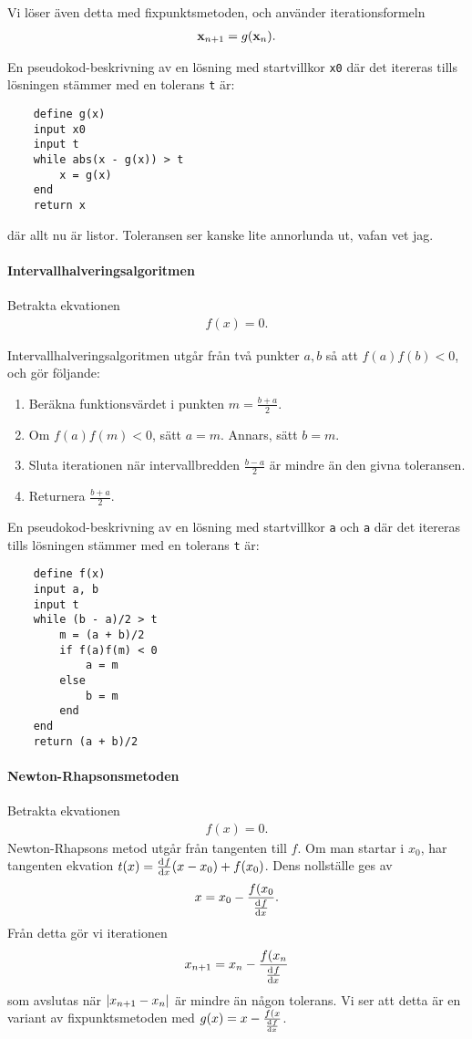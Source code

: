 Vi löser även detta med fixpunktsmetoden, och använder iterationsformeln
\begin{align*}
	\vb{x}_{n + 1} = g(\vb{x}_{n}).
\end{align*}

En pseudokod-beskrivning av en lösning med startvillkor \verb|x0| där det itereras tills lösningen stämmer med en tolerans \verb|t| är:
\begin{lstlisting}
	define g(x)
	input x0
	input t
	while abs(x - g(x)) > t
		x = g(x)
	end
	return x
\end{lstlisting}
där allt nu är listor. Toleransen ser kanske lite annorlunda ut, vafan vet jag.

\paragraph{Intervallhalveringsalgoritmen}
Betrakta ekvationen
\begin{align*}
	f(x) = 0.
\end{align*}

Intervallhalveringsalgoritmen utgår från två punkter $a, b$ så att $f(a)f(b) < 0$, och gör följande:
\begin{enumerate}
	\item Beräkna funktionsvärdet i punkten $m = \frac{b + a}{2}$.
	\item Om $f(a)f(m) < 0$, sätt $a = m$. Annars, sätt $b = m$.
	\item Sluta iterationen när intervallbredden $\frac{b - a}{2}$ är mindre än den givna toleransen.
	\item Returnera $\frac{b + a}{2}$.
\end{enumerate}

En pseudokod-beskrivning av en lösning med startvillkor \verb|a| och \verb|a| där det itereras tills lösningen stämmer med en tolerans \verb|t| är:
\begin{lstlisting}
	define f(x)
	input a, b
	input t
	while (b - a)/2 > t
		m = (a + b)/2
		if f(a)f(m) < 0
			a = m
		else
			b = m
		end
	end
	return (a + b)/2
\end{lstlisting}

\paragraph{Newton-Rhapsonsmetoden}
Betrakta ekvationen
\begin{align*}
	f(x) = 0.
\end{align*}
Newton-Rhapsons metod utgår från tangenten till $f$. Om man startar i $x_{0}$, har tangenten ekvation $t(x) = \dv[]{f}{x} (x_{0})(x - x_{0}) + f(x_{0})$. Dens nollställe ges av
\begin{align*}
	x = x_{0} - \frac{f(x_{0}}{\dv[]{f}{x} (x_{0})}.
\end{align*}
Från detta gör vi iterationen
\begin{align*}
	x_{n + 1} = x_{n} - \frac{f(x_{n}}{\dv[]{f}{x} (x_{n})}
\end{align*}
som avslutas när $\abs{x_{n + 1} - x_{n}}$ är mindre än någon tolerans. Vi ser att detta är en variant av fixpunktsmetoden med $g(x) = x - \frac{f(x}{\dv[]{f}{x} (x)}$.

